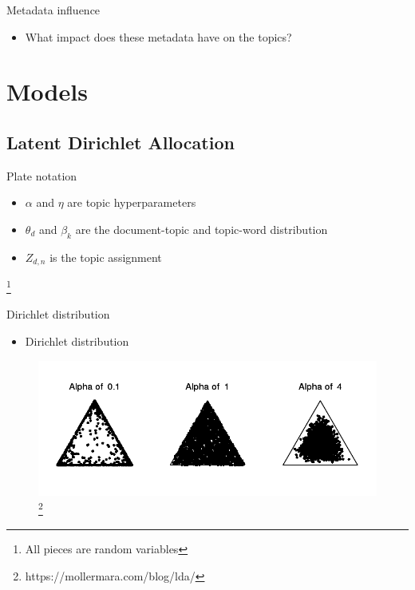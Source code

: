 \begin{frame}{\insertsection}{Metadata influence}
	\begin{itemize}
		\item What impact does these metadata have on the topics?
	\end{itemize}
\end{frame}

\section{Models}

\subsection{Latent Dirichlet Allocation}

\begin{frame}{\insertsubsection}{Plate notation}
	\begin{figure}
		\centering
		\resizebox{\textwidth}{!}{%
			
		}
	\end{figure}
	\begin{itemize}
		\item $\alpha$ and $\eta$ are topic hyperparameters
		\item $\theta_d$ and $\beta_k$ are the document-topic and topic-word distribution
		\item $Z_{d,n}$ is the topic assignment 
	\end{itemize}
	\let\thefootnote\relax\footnote{\tiny{All pieces are random variables}}
\end{frame}


\begin{frame}{\insertsubsection}{Dirichlet distribution}
	\begin{itemize}
		\item Dirichlet distribution
	\end{itemize}
	\begin{figure}
		\includegraphics[width=\textwidth]{figures/dirich.png}
		\let\thefootnote\relax\footnote{\tiny{https://mollermara.com/blog/lda/}}
	\end{figure}
\end{frame}


